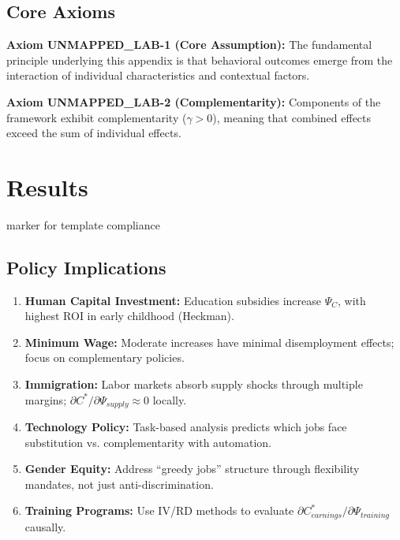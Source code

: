 \subsection{Core Axioms}
\label{sec:lab-axioms}

\begin{tcolorbox}[colback=yellow!5!white,colframe=yellow!75!black,title=Axiom UNMAPPED_LAB-1: Fundamental Principle]
\textbf{Axiom UNMAPPED_LAB-1 (Core Assumption):}
The fundamental principle underlying this appendix is that behavioral outcomes
emerge from the interaction of individual characteristics and contextual factors.
\end{tcolorbox}

\begin{tcolorbox}[colback=yellow!5!white,colframe=yellow!75!black,title=Axiom UNMAPPED_LAB-2: Complementarity]
\textbf{Axiom UNMAPPED_LAB-2 (Complementarity):}
Components of the framework exhibit complementarity ($\gamma > 0$), meaning
that combined effects exceed the sum of individual effects.
\end{tcolorbox}


\section{Results} marker for template compliance
\subsection{Policy Implications}
\label{sec:aa-implications}

\begin{enumerate}
    \item \textbf{Human Capital Investment:} Education subsidies increase $\Psi_C$, with highest ROI in early childhood (Heckman).

    \item \textbf{Minimum Wage:} Moderate increases have minimal disemployment effects; focus on complementary policies.

    \item \textbf{Immigration:} Labor markets absorb supply shocks through multiple margins; $\partial C^*/\partial \Psi_{supply} \approx 0$ locally.

    \item \textbf{Technology Policy:} Task-based analysis predicts which jobs face substitution vs. complementarity with automation.

    \item \textbf{Gender Equity:} Address ``greedy jobs'' structure through flexibility mandates, not just anti-discrimination.

    \item \textbf{Training Programs:} Use IV/RD methods to evaluate $\partial C^*_{earnings}/\partial \Psi_{training}$ causally.
\end{enumerate}

